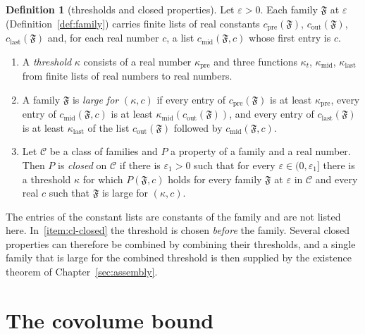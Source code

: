\documentclass[11pt]{amsbook}
\theoremstyle{plain}
\theoremstyle{definition}
\newtheorem{definition}[theorem]{Definition}
\theoremstyle{remark}
\numberwithin{equation}{section}
\numberwithin{figure}{chapter}
\numberwithin{table}{chapter}
\newcommand{\eps}{\varepsilon}
\newcommand{\Fam}{\mathfrak{F}}
\begin{document}
\begin{definition}[thresholds and closed properties]\label{def:closed}
Let $\eps>0$. Each family $\Fam$ at $\eps$
(Definition~\ref{def:family}) carries finite lists of real constants
$c_{\mathrm{pre}}(\Fam)$, $c_{\mathrm{out}}(\Fam)$,
$c_{\mathrm{last}}(\Fam)$ and, for each real number $c$, a list
$c_{\mathrm{mid}}(\Fam,c)$ whose first entry is $c$.
\begin{enumerate}[label=(\arabic*)]
\item A \emph{threshold} $\kappa$ consists of a real number
$\kappa_{\mathrm{pre}}$ and three functions $\kappa_t$,
$\kappa_{\mathrm{mid}}$, $\kappa_{\mathrm{last}}$ from finite lists of
real numbers to real numbers.
\item A family $\Fam$ is \emph{large for} $(\kappa,c)$ if every entry
of $c_{\mathrm{pre}}(\Fam)$ is at least $\kappa_{\mathrm{pre}}$, every
entry of $c_{\mathrm{mid}}(\Fam,c)$ is at least
$\kappa_{\mathrm{mid}}(c_{\mathrm{out}}(\Fam))$, and every entry of
$c_{\mathrm{last}}(\Fam)$ is at least $\kappa_{\mathrm{last}}$ of the
list $c_{\mathrm{out}}(\Fam)$ followed by $c_{\mathrm{mid}}(\Fam,c)$.
\item\label{item:cl-closed}
Let $\mathcal C$ be a class of families and $P$ a property of a
family and a real number. Then $P$ is \emph{closed} on $\mathcal C$ if
there is $\eps_1>0$ such that for every $\eps\in(0,\eps_1]$ there is a
threshold $\kappa$ for which $P(\Fam,c)$ holds for every family
$\Fam$ at $\eps$ in $\mathcal C$ and every real $c$ such that $\Fam$
is large for $(\kappa,c)$.
\end{enumerate}
\end{definition}

\noindent The entries of the constant lists are constants of the
family and are not listed here. In~\ref{item:cl-closed} the threshold is chosen
\emph{before} the family. Several closed properties can therefore be combined by
combining their thresholds, and a single family that is large for the
combined threshold is then supplied by the existence theorem of
Chapter~\ref{sec:assembly}.

\section{The covolume bound}
\end{document}
